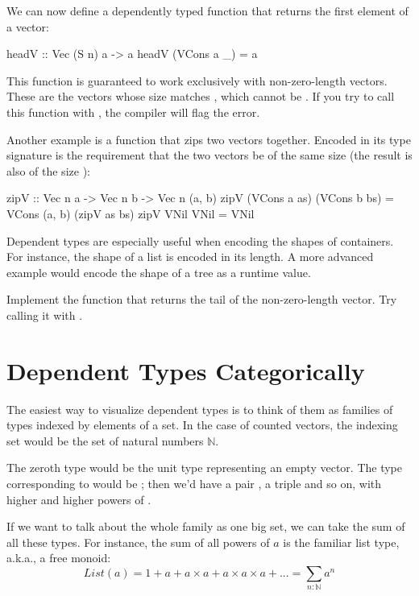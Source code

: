\documentclass[DaoFP]{subfiles}
\begin{document}
We can now define a dependently typed function that returns the first element of a vector:
\begin{haskell}
headV :: Vec (S n) a -> a
headV (VCons a _) = a
\end{haskell}
This function is guaranteed to work exclusively with non-zero-length vectors. These are the vectors whose size matches , which cannot be . If you try to call this function with , the compiler will flag the error.

Another example is a function that zips two vectors together. Encoded in its type signature is the requirement that the two vectors be of the same size  (the result is also of the size ):
\begin{haskell}
zipV :: Vec n a -> Vec n b -> Vec n (a, b)
zipV (VCons a as) (VCons b bs) = VCons (a, b) (zipV as bs)
zipV VNil VNil = VNil
\end{haskell}

Dependent types are especially useful when encoding the shapes of containers. For instance, the shape of a list is encoded in its length. A more advanced example would encode the shape of a tree as a runtime value.  

\begin{exercise}
Implement the function  that returns the tail of the non-zero-length vector. Try calling it with .
\end{exercise}

\section{Dependent Types Categorically}

The easiest way to visualize dependent types is to think of them as families of types indexed by elements of a set. In the case of counted vectors, the indexing set would be the set of natural numbers $\mathbb{N}$.

The zeroth type would be the unit type \hask{()} representing an empty vector. The type corresponding to  would be ; then we'd have a pair , a triple  and so on, with higher and higher powers of .

If we want to talk about the whole family as one big set, we can take the sum of all these types. For instance, the sum of all powers of $a$ is the familiar list type, a.k.a., a free monoid:
\[ \mathit{List} (a) = 1 + a + a \times a + a \times a \times a + ... =  \sum_{n:\mathbb{N}} a^n \]
\end{document}

